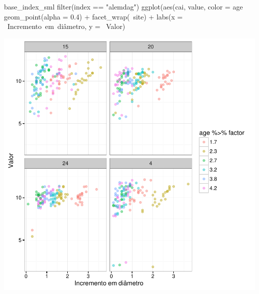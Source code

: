 \documentclass[article]{jss}
\begin{document}
\begin{CodeChunk}
\begin{CodeInput}
base_index_sml %
  filter(index == "alemdag") %
  ggplot(aes(cai, value, color = age %
    geom_point(alpha = 0.4) +
    facet_wrap(~site) +
    labs(x = ~Incremento~em~diâmetro, y = ~Valor)
\end{CodeInput}


\begin{center}\includegraphics{comp3-paper_files/figure-latex/disp_alemdag-1} \end{center}

\end{CodeChunk}
\end{document}
